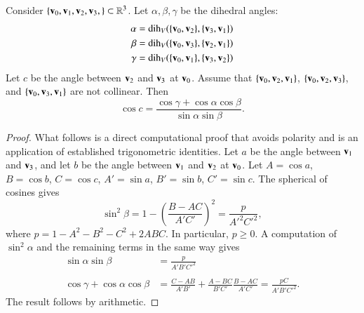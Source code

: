 \begin{lemma}
\label{lemma:sloc2}  Consider 
  $\{{\mathbf v}_0,{\mathbf v}_1,{\mathbf v}_2,{\mathbf v}_3,\}\subset\mathbb{R}^3$.  Let
  $\alpha,\beta,\gamma$ be the dihedral angles:
\begin{align*}
\alpha &= \operatorname{dih}_V(\{{\mathbf v}_0,{\mathbf v}_2\},\{{\mathbf v}_3,{\mathbf v}_1\})\\
\beta &= \operatorname{dih}_V(\{{\mathbf v}_0,{\mathbf v}_3\},\{{\mathbf v}_2,{\mathbf v}_1\})\\
\gamma&= \operatorname{dih}_V(\{{\mathbf v}_0,{\mathbf v}_1\},\{{\mathbf v}_3,{\mathbf v}_2\})\\
\end{align*}
Let $c$ be the
angle between ${\mathbf v}_2$ and ${\mathbf v}_3$ at ${\mathbf v}_0$. 
Assume that $\{{\mathbf v}_0,{\mathbf v}_2,{\mathbf v}_1\}$, $\{{\mathbf v}_0,{\mathbf v}_2,{\mathbf v}_3\}$, and $\{{\mathbf v}_0,{\mathbf v}_3,{\mathbf v}_1\}$ are not collinear.
Then
\[ 
\cos c = \frac{\cos \gamma + \cos \alpha \cos \beta}
{\sin \alpha\sin \beta}.
\] 
\end{lemma}
%
%

\begin{proof}  
  What follows is a direct computational proof that avoids polarity and
is an
  application of established trigonometric identities.  Let $a$ be the
  angle between ${\mathbf v}_1$ and ${\mathbf v}_3$, and let $b$ be the angle between ${\mathbf v}_1$
  and ${\mathbf v}_2$ at ${\mathbf v}_0$.  Let $A=\cos a$, $B=\cos b$, $C=\cos c$,
  $A'=\sin a$, $B'=\sin b$, $C'=\sin c$.  The spherical
   of cosines gives
\[ \sin^2\beta = 1-\left(\frac{B-A C}{A' C'}\right)^2
  = \frac{p}{A'^2 C'^2},\] 
where $p=1-A^2 - B^2 - C^2 + 2 A B C$.
In particular, $p\ge 0$.
%
A computation of $\sin^2\alpha$ and the remaining terms in the same way gives
\begin{align*}
  \sin\alpha\sin\beta &= \frac{\displaystyle p}{\displaystyle A' B' C'^2}\\ 
  \\
  \cos\gamma + \cos\alpha \cos\beta &=
  \frac{\displaystyle C - A B}{\displaystyle A' B'} + 
\frac{\displaystyle A - B C}{\displaystyle B' C'} 
\frac{\displaystyle B - A C}{\displaystyle A' C'}
  = \frac{\displaystyle p C}{\displaystyle A' B' C'^2}.
\end{align*}
The result follows by  arithmetic.
\end{proof}

